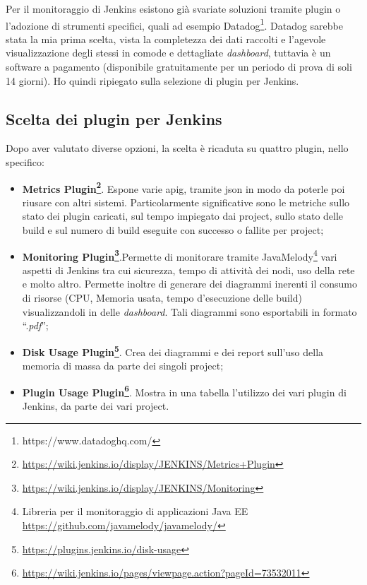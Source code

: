Per il monitoraggio di Jenkins esistono già svariate soluzioni tramite \gls{plugin} o l'adozione di strumenti specifici, quali ad esempio Datadog\footnote{https://www.datadoghq.com/}. Datadog sarebbe stata la mia prima scelta, vista la completezza dei dati raccolti e l'agevole visualizzazione degli stessi in comode e dettagliate \textit{dashboard}, tuttavia è un software a pagamento (disponibile gratuitamente per un periodo di prova di soli 14 giorni). Ho quindi ripiegato sulla selezione di \gls{plugin} per Jenkins.

\subsection{Scelta dei plugin per Jenkins}
\label{subsec:scelta-plugin}

Dopo aver valutato diverse opzioni, la scelta è ricaduta su quattro \gls{plugin}, nello specifico:

\begin{itemize}
    \item \textbf{Metrics Plugin\footnote{\url{https://wiki.jenkins.io/display/JENKINS/Metrics+Plugin}}}. Espone varie \gls{apig}, tramite \gls{json} in modo da poterle poi riusare
    con altri sistemi. Particolarmente significative sono le metriche sullo stato dei \gls{plugin}
    caricati, sul tempo impiegato dai \gls{project}, sullo stato delle \gls{build} e sul numero di build eseguite con successo o fallite per project;
    \item \textbf{Monitoring Plugin\footnote{\url{https://wiki.jenkins.io/display/JENKINS/Monitoring}}}.Permette di monitorare tramite
    JavaMelody\footnote{Libreria per il monitoraggio di applicazioni \gls{Java EE} \url{https://github.com/javamelody/javamelody/}} vari aspetti di Jenkins tra cui
    sicurezza, tempo di attività dei nodi, uso della rete e molto altro. Permette inoltre di generare dei diagrammi inerenti il consumo di risorse (CPU, Memoria usata, tempo d'esecuzione delle build) visualizzandoli in delle \textit{dashboard}. Tali diagrammi sono esportabili in formato ``.\textit{pdf}'';
    \item \textbf{Disk Usage Plugin\footnote{\url{https://plugins.jenkins.io/disk-usage}}}. Crea dei diagrammi e dei report sull'uso della memoria di massa da parte dei singoli \gls{project};
    \item \textbf{Plugin Usage Plugin\footnote{\url{https://wiki.jenkins.io/pages/viewpage.action?pageId=73532011}}}. Mostra in una tabella l'utilizzo dei vari \gls{plugin} di Jenkins, da parte dei vari \gls{project}.
\end{itemize}


